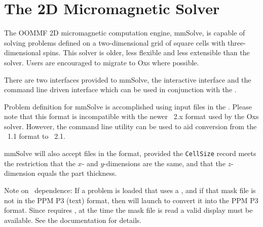 \section{The 2D Micromagnetic Solver}\label{sec:mmsolve}%

\setcounter{msoldsecnumdepth}{\value{secnumdepth}}
\setcounter{secnumdepth}{4}


The OOMMF 2D micromagnetic computation engine, mmSolve, is capable of
solving problems defined on a two-dimensional grid of square cells with
three-dimensional spins.  This solver is older, less flexible and less
extensible than the  solver.
Users are encouraged to migrate to Oxs where possible.

There are two interfaces provided to mmSolve, the interactive
interface and the command line driven
interface which can be used in conjunction with the
.

Problem definition for mmSolve is accomplished using input files in the
.
Please note that this format is incompatible with the newer \MIF~2.x
format used by the Oxs solver.  However, the command line utility
 can be used to aid conversion from the
\MIF~1.1 format to \MIF~2.1.

mmSolve will also accept files in the  format, provided the
\texttt{CellSize} record meets the restriction that the $x$- and
$y$-dimensions are the same, and that the $z$-dimension equals the part
thickness.

Note on \Tk\ dependence: If a problem is loaded that uses a
{}, and
if that mask file is not in the PPM P3 (text) format, then
 will launch {} to convert it into
the PPM P3 format.  Since 
requires \Tk, at the
time the mask file is read a valid display must be available.  See the
 documentation for details.

